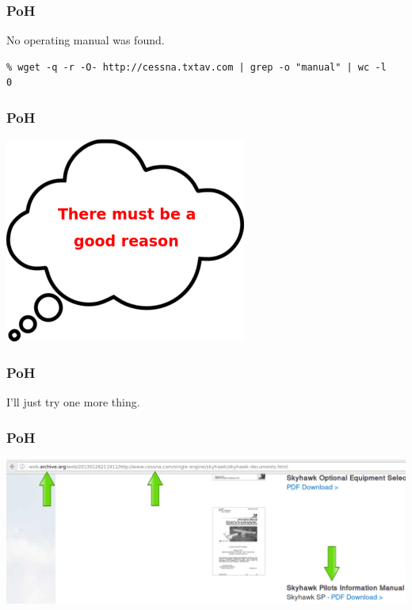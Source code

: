 \begin{frame}[fragile]
\frametitle{PoH}
\begin{center}
No operating manual was found.
\tiny{
\begin{lstlisting}
% wget -q -r -O- http://cessna.txtav.com | grep -o "manual" | wc -l
0
\end{lstlisting}
}
\end{center}
\end{frame}

\begin{frame}
\frametitle{PoH}
\begin{center}
\includegraphics[height=0.5\textheight]{image/thought-bubble-there-must-be-a-good-reason.png}
\end{center}
\end{frame}

\begin{frame}
\frametitle{PoH}
\begin{center}
I'll just try one more thing.
\end{center}
\end{frame}

\begin{frame}
\frametitle{PoH}
\begin{center}
\includegraphics[height=0.4\textheight]{image/poh-web-archive-org.png}
\end{center}
\end{frame}

